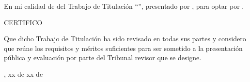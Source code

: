 
En mi calidad de \UTITutorEtiqueta{} del Trabajo de Titulación ``\UTITituloProyectoMayusculas'', presentado por \UTIAutoresTexto, para optar por \UTIFraseTituloProfesional{}.

\begin{center}
CERTIFICO
\end{center}

Que dicho Trabajo de Titulación ha sido revisado en todas sus partes y considero que reúne los requisitos y méritos suficientes para ser sometido a la presentación pública y evaluación por parte del Tribunal revisor que se designe.

\vspace{1.5cm}

{\raggedleft
\UTICiudadPais, xx de xx de \UTIAnio\par}

\vspace{2.5cm}

\UTIFirmaTutorBloque
